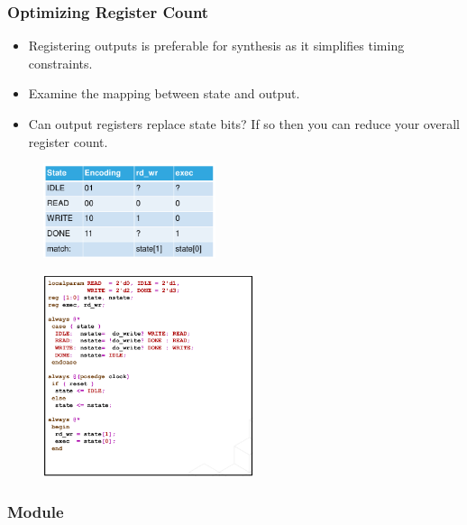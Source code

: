 \documentclass[t, notes, xcolor=table]{beamer}
\begin{document}
\begin{frame}
\frametitle{Optimizing Register Count}

\scriptsize{
\begin{multicols}{2}
\begin{itemize}
\item Registering outputs is preferable for synthesis as it
simplifies timing constraints.
\item Examine the mapping between state and output.
\item Can output registers replace state bits? If so then you can reduce your overall register count.
\end{itemize}
\vfill
\begin{figure}
    \includegraphics[width=0.45\textwidth]{img/14_FSM_optimize.png}
\end{figure}
\columnbreak
\begin{figure}
    \includegraphics[width=0.55\textwidth]{img/14_FSM_optimize2.png}
\end{figure}
\end{multicols}
}
\end{frame}


\begin{frame}
\frametitle{Module}

\end{frame}
\note{
\scriptsize{

}
}
\end{document}
